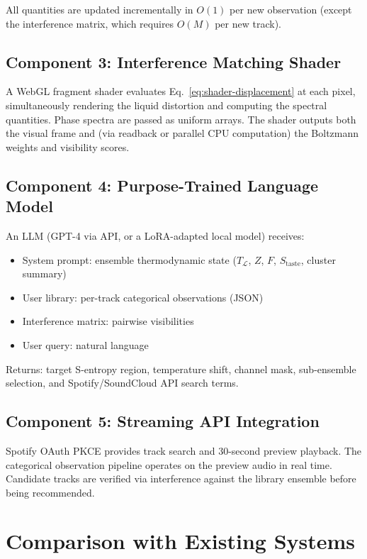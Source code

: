 \documentclass[11pt,twocolumn,a4paper]{article}
\newcommand{\Lib}{\mathcal{L}}
\begin{document}
All quantities are updated incrementally in $O(1)$ per new observation
(except the interference matrix, which requires $O(M)$ per new track).

\subsection{Component 3: Interference Matching Shader}

A WebGL fragment shader evaluates
Eq.~\eqref{eq:shader-displacement} at each pixel, simultaneously
rendering the liquid distortion and computing the spectral quantities.
Phase spectra are passed as uniform arrays. The shader outputs
both the visual frame and (via readback or parallel CPU computation)
the Boltzmann weights and visibility scores.

\subsection{Component 4: Purpose-Trained Language Model}

An LLM (GPT-4 via API, or a LoRA-adapted local model) receives:
\begin{itemize}[leftmargin=*,itemsep=1pt]
\item System prompt: ensemble thermodynamic state ($T_{\Lib}$, $Z$,
  $F$, $S_{\mathrm{taste}}$, cluster summary)
\item User library: per-track categorical observations (JSON)
\item Interference matrix: pairwise visibilities
\item User query: natural language
\end{itemize}

Returns: target S-entropy region, temperature shift, channel mask,
sub-ensemble selection, and Spotify/SoundCloud API search terms.

\subsection{Component 5: Streaming API Integration}

Spotify OAuth PKCE provides track search and 30-second preview
playback. The categorical observation pipeline operates on the preview
audio in real time. Candidate tracks are verified via interference
against the library ensemble before being recommended.


\section{Comparison with Existing Systems}
\label{sec:comparison}
\end{document}
